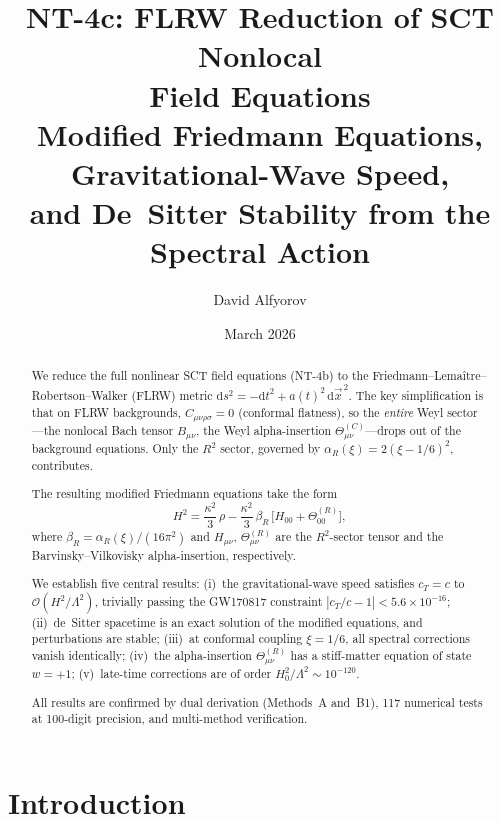 \documentclass[11pt,a4paper]{article}
\title{NT-4c: FLRW Reduction of SCT Nonlocal\\
Field Equations\\[6pt]
\large Modified Friedmann Equations, Gravitational-Wave Speed,\\
and De~Sitter Stability from the Spectral Action}
\author{David Alfyorov}
\date{March 2026}
\renewcommand{\dd}{\mathrm{d}}
\theoremstyle{plain}
\theoremstyle{definition}
\begin{document}
\maketitle

\begin{center}
\end{center}

\begin{abstract}
We reduce the full nonlinear SCT field equations (NT-4b) to the
Friedmann--Lema\^itre--Robertson--Walker (FLRW) metric
$\dd s^2 = -\dd t^2 + a(t)^2\,\dd\vec{x}^{\,2}$. The key simplification is that
on FLRW backgrounds, $C_{\mu\nu\rho\sigma} = 0$ (conformal flatness), so the
\emph{entire} Weyl sector---the nonlocal Bach tensor $B_{\mu\nu}$, the
Weyl alpha-insertion $\Theta^{(C)}_{\mu\nu}$---drops out of the background
equations. Only the $R^2$ sector, governed by
$\alpha_R(\xi) = 2(\xi - 1/6)^2$, contributes.

The resulting modified Friedmann equations take the form
\begin{equation*}
  H^2 = \frac{\kappa^2}{3}\,\rho
  - \frac{\kappa^2}{3}\,\beta_R\,
  \bigl[H_{00} + \Theta^{(R)}_{00}\bigr],
\end{equation*}
where $\beta_R = \alpha_R(\xi)/(16\pi^2)$ and $H_{\mu\nu}$,
$\Theta^{(R)}_{\mu\nu}$ are the $R^2$-sector tensor and the
Barvinsky--Vilkovisky alpha-insertion, respectively.

We establish five central results:
(i)~the gravitational-wave speed satisfies $c_T = c$ to
$\mathcal{O}(H^2/\Lambda^2)$, trivially passing the GW170817 constraint
$|c_T/c - 1| < 5.6 \times 10^{-16}$;
(ii)~de~Sitter spacetime is an exact solution of the modified equations,
and perturbations are stable;
(iii)~at conformal coupling $\xi = 1/6$, all spectral corrections vanish
identically;
(iv)~the alpha-insertion $\Theta^{(R)}_{\mu\nu}$ has a stiff-matter
equation of state $w = +1$;
(v)~late-time corrections are of order $H_0^2/\Lambda^2 \sim 10^{-120}$.

All results are confirmed by dual derivation (Methods~A and~B1),
117 numerical tests at 100-digit precision, and multi-method verification.
\end{abstract}

\tableofcontents

\section{Introduction}\label{sec:intro}
\end{document}

